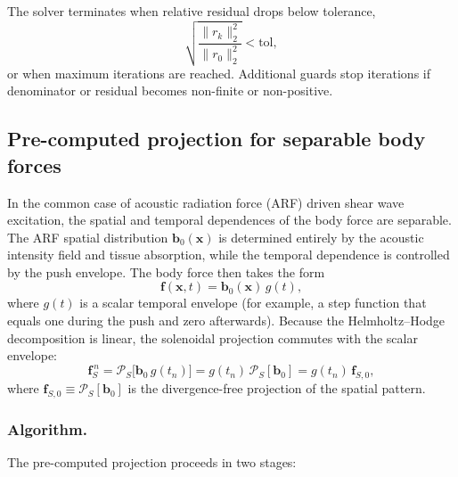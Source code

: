 \documentclass{iopjournal}
\begin{document}
The solver terminates when relative residual drops below tolerance,
\begin{equation}
\sqrt{\frac{\|r_k\|_2^2}{\|r_0\|_2^2}} < \text{tol},
\end{equation}
or when maximum iterations are reached. Additional guards stop iterations if
denominator or residual becomes non-finite or non-positive.




\subsection{Pre-computed projection for separable body forces}
\label{sec:precomputed_projection}

In the common case of acoustic radiation force (ARF) driven shear wave
excitation, the spatial and temporal dependences of the body force are
separable. The ARF spatial distribution $\bm{b}_0(\bm{x})$ is determined
entirely by the acoustic intensity field and tissue absorption, while the
temporal dependence is controlled by the push envelope. The body force then
takes the form
\begin{equation}
\bm{f}(\bm{x},t) = \bm{b}_0(\bm{x})\,g(t),
\label{eq:separable_force}
\end{equation}
where $g(t)$ is a scalar temporal envelope (for example, a step function that
equals one during the push and zero afterwards). Because the Helmholtz--Hodge
decomposition is linear, the solenoidal projection commutes with the scalar
envelope:
\begin{equation}
\bm{f}_S^{\,n}
= \mathcal{P}_S\!\bigl[\bm{b}_0\,g(t_n)\bigr]
= g(t_n)\,\mathcal{P}_S[\bm{b}_0]
= g(t_n)\,\bm{f}_{S,0},
\label{eq:projected_separable}
\end{equation}
where $\bm{f}_{S,0} \equiv \mathcal{P}_S[\bm{b}_0]$ is the divergence-free
projection of the spatial pattern.

\subsubsection{Algorithm.}
The pre-computed projection proceeds in two stages:
\end{document}
